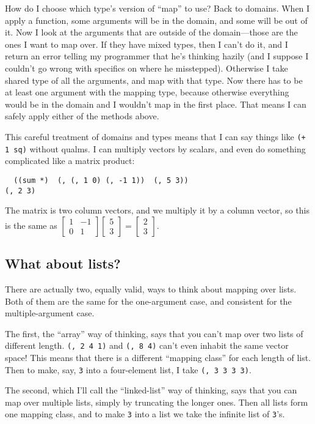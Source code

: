 \documentclass{article}
\newcommand{\code}[1]{\lstinline`#1`}
\begin{document}
How do I choose which type's version of ``map'' to use? Back to domains. When I apply a function, some arguments will be in the domain, and some will be out of it. Now I look at the arguments that are outside of the domain---those are the ones I want to map over. If they have mixed types, then I can't do it, and I return an error telling my programmer that he's thinking hazily (and I suppose I couldn't go wrong with specifics on where he misstepped). Otherwise I take shared type of all the arguments, and map with that type. Now there has to be at least one argument with the mapping type, because otherwise everything would be in the domain and I wouldn't map in the first place. That means I can safely apply either of the methods above.

This careful treatment of domains and types means that I can say things like \code{(+ 1 sq)} without qualms. I can multiply vectors by scalars, and even do something complicated like a matrix product:
\begin{lstlisting}
  ((sum *)  (, (, 1 0) (, -1 1))  (, 5 3))
(, 2 3)
\end{lstlisting}
\newcommand{\smat}[1]{\left[\begin{smallmatrix}#1\end{smallmatrix}\right]}
The matrix is two column vectors, and we multiply it by a column vector, so this is the same as $\smat{1&-1\\0&1}\smat{5\\3} = \smat{2\\3}.$

\subsection{What about lists?}
There are actually two, equally valid, ways to think about mapping over lists. Both of them are the same for the one-argument case, and consistent for the multiple-argument case.

The first, the ``array'' way of thinking, says that you can't map over two lists of different length. \code{(, 2 4 1)} and \code{(, 8 4)} can't even inhabit the same vector space! This means that there is a different ``mapping class'' for each length of list. Then to make, say, \code{3} into a four-element list, I take \code{(, 3 3 3 3)}.

The second, which I'll call the ``linked-list'' way of thinking, says that you can map over multiple lists, simply by truncating the longer ones. Then all lists form one mapping class, and to make \code{3} into a list we take the infinite list of \code{3}'s.
\end{document}
